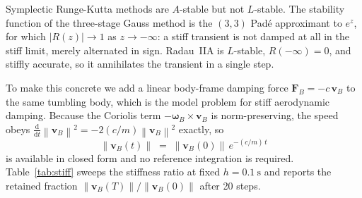\documentclass[a4paper,10pt]{article}
\newcommand{\norm}[1]{\left\lVert #1 \right\rVert}
\newcommand{\omB}{\boldsymbol{\omega}_B}
\newcommand{\vB}{\mathbf{v}_B}
\theoremstyle{definition}
\begin{document}
Symplectic Runge-Kutta methods are $A$-stable but not $L$-stable.  The stability
function of the three-stage Gauss method is the $(3,3)$ Pad\'e approximant to
$e^z$, for which $\lvert R(z)\rvert \to 1$ as $z \to -\infty$: a stiff transient
is not damped at all in the stiff limit, merely alternated in sign.  Radau~IIA
is $L$-stable, $R(-\infty) = 0$, and stiffly accurate, so it annihilates the
transient in a single step.

To make this concrete we add a linear body-frame damping force
$\mathbf{F}_B = -c\,\vB$ to the same tumbling body, which is the model problem
for stiff aerodynamic damping.  Because the Coriolis term $-\omB \times \vB$ is
norm-preserving, the speed obeys
$\tfrac{\mathrm{d}}{\mathrm{d}t}\norm{\vB}^2 = -2(c/m)\norm{\vB}^2$ exactly, so
\begin{equation}
  \norm{\vB(t)} \;=\; \norm{\vB(0)}\, e^{-(c/m)\,t}
  \label{eq:stiff_exact}
\end{equation}
is available in closed form and no reference integration is required.
Table~\ref{tab:stiff} sweeps the stiffness ratio at fixed
$h = \SI{0.1}{\second}$ and reports the retained fraction
$\norm{\vB(T)}/\norm{\vB(0)}$ after \num{20} steps.
\end{document}
